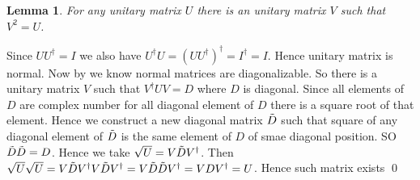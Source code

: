 \documentclass[a4paper, 11pt]{article}
\newtheorem{lemma}{Lemma}
\renewenvironment{proof}{\noindent{\it \textbf{Proof:}}\hspace*{1em}}{\qed\bigskip\\}
\begin{document}
{	\begin{lemma}
		For any unitary matrix $U$ there is an unitary matrix $V$ such that $V^2=U$.
	\end{lemma}
	\begin{proof}
		Since $UU^{\dagger}=I$ we also have $U^{\dagger}U=(UU^{\dagger})^{\dagger}=I^{\dagger}=I$. Hence unitary matrix is normal. Now by  we know normal matrices are diagonalizable. So there is a unitary matrix $V$ such that $V^{\dagger}UV=D$ where $D$ is diagonal. Since all elements of $D$ are complex number for all diagonal element of $D$ there is a square root of that element. Hence we construct a new diagonal matrix $\tilde{D}$ such that square of any diagonal element of $\tilde{D}$ is the same element of $D$ of smae diagonal position. SO $\tilde{D}\tilde{D}=D$. Hence we take $\sqrt{U}=V\tilde{D} V^{\dagger}$. Then $\sqrt{U}\sqrt{U}=V\tilde{D} V^{\dagger}V\tilde{D} V^{\dagger}=V\tilde{D}\tilde{D} V^{\dagger}=VDV^{\dagger}=U$. Hence such matrix exists
	\end{proof}
	
}
\end{document}
